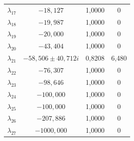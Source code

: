 \begin{longtable}{>{\centering\arraybackslash}m{1.5cm} c c c}
	$\lambda_{17}$ & $-18{,}127$                    & 1,0000 & 0 \\
	$\lambda_{18}$ & $-19{,}987$                    & 1,0000 & 0 \\
	$\lambda_{19}$ & $-20{,}000$                    & 1,0000 & 0 \\
	$\lambda_{20}$ & $-43{,}404$                    & 1,0000 & 0 \\
	$\lambda_{21}$ & $-58{,}506 \pm 40{,}712i$      & 0,8208 & 6,480 \\
	$\lambda_{22}$ & $-76{,}307$                    & 1,0000 & 0 \\
	$\lambda_{23}$ & $-98{,}646$                    & 1,0000 & 0 \\
	$\lambda_{24}$ & $-100{,}000$                   & 1,0000 & 0 \\
	$\lambda_{25}$ & $-100{,}000$                   & 1,0000 & 0 \\
	$\lambda_{26}$ & $-207{,}886$                   & 1,0000 & 0 \\
	$\lambda_{27}$ & $-1000{,}000$                  & 1,0000 & 0 \\
\end{longtable}
\par
\endgroup

